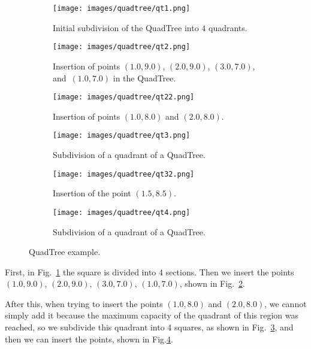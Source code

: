 \documentclass[English]{ic-tese-v3}
\begin{document}
\begin{figure}
\centering
    \begin{subfigure}[t]{0.45\textwidth}
    \centering
        \texttt{[image: images/quadtree/qt1.png]}
        \caption{\footnotesize Initial subdivision of the QuadTree into $4$ quadrants.}
        \label{fig:qt_ex1}
    \end{subfigure}\hfill
    \begin{subfigure}[t]{0.45\textwidth}
    \centering
        \texttt{[image: images/quadtree/qt2.png]}
        \caption{\footnotesize Insertion of points $(1.0, 9.0)$, $(2.0, 9.0)$, $(3.0, 7.0)$, and~$(1.0, 7.0)$ in the QuadTree.}
        \label{fig:qt_ex2}
    \end{subfigure}
    \bigskip
    \bigskip
    \begin{subfigure}[t]{0.45\textwidth}
    \centering
        \texttt{[image: images/quadtree/qt22.png]}
        \caption{\footnotesize Insertion of points $(1.0, 8.0)$ and $(2.0, 8.0)$.}
        \label{fig:qt_ex3}
    \end{subfigure}\hfill
    \begin{subfigure}[t]{0.45\textwidth}
    \centering
        \texttt{[image: images/quadtree/qt3.png]}
        \caption{\footnotesize Subdivision of a quadrant of a QuadTree.}
        \label{fig:qt_ex4}
    \end{subfigure}
    \bigskip
    \bigskip
    \begin{subfigure}[t]{0.45\textwidth}
    \centering
        \texttt{[image: images/quadtree/qt32.png]}
        \caption{\footnotesize Insertion of the point $(1.5, 8.5)$.}
        \label{fig:qt_ex5}
    \end{subfigure}\hfill
    \begin{subfigure}[t]{0.45\textwidth}
    \centering
        \texttt{[image: images/quadtree/qt4.png]}
        \caption{\footnotesize Subdivision of a quadrant of a QuadTree.}
        \label{fig:qt_ex6}
    \end{subfigure}
    \caption[QuadTree example]{QuadTree example.}
    \label{fig:qt_ex}
\end{figure}

First, in Fig.~\ref{fig:qt_ex1} the square is divided into 4 sections. Then we insert the points $(1.0, 9.0)$, $(2.0, 9.0)$, $(3.0, 7.0)$, $(1.0, 7.0)$, shown in Fig.~\ref{fig:qt_ex2}. 

After this, when trying to insert the points $(1.0, 8.0)$ and $(2.0, 8.0)$, we cannot simply add it because the maximum capacity of the quadrant of this region was reached, so we subdivide this quadrant into 4 squares, as shown in Fig.~\ref{fig:qt_ex3}, and then we can insert the points, shown in Fig.\ref{fig:qt_ex4}.
\end{document}
